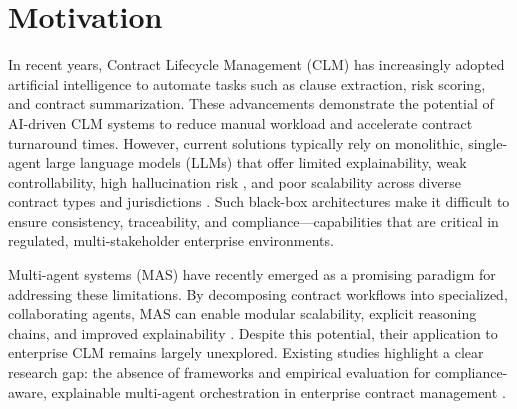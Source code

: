 \section{Motivation}\label{section:motivation}

In recent years, Contract Lifecycle Management (CLM) \cite{wikipedia2025contractlifecyclemanagement} has increasingly adopted artificial intelligence to automate tasks such as clause extraction, risk scoring, and contract summarization. These advancements demonstrate the potential of AI-driven CLM systems to reduce manual workload and accelerate contract turnaround times. However, current solutions typically rely on monolithic, single-agent large language models (LLMs) that offer limited explainability, weak controllability, high hallucination risk \cite{hallucinationlegal}, and poor scalability across diverse contract types and jurisdictions \cite{billi2023largelanguagemodelsexplainable,xia2025parallelismmeetsadaptivenessscalable}. Such black-box architectures make it difficult to ensure consistency, traceability, and compliance—capabilities that are critical in regulated, multi-stakeholder enterprise environments. \cite{blackboxalgorithms,wang2024legalevalutionschallengeslarge}

Multi-agent systems (MAS) have recently emerged as a promising paradigm for addressing these limitations. By decomposing contract workflows into specialized, collaborating agents, MAS can enable modular scalability, explicit reasoning chains, and improved explainability \cite{shu2024effectivegenaimultiagentcollaboration, wang2024mixtureofagentsenhanceslargelanguage}. Despite this potential, their application to enterprise CLM remains largely unexplored. Existing studies highlight a clear research gap: the absence of frameworks and empirical evaluation for compliance-aware, explainable multi-agent orchestration in enterprise contract management \cite{yehudai2025llmagentevaluationregulated}.